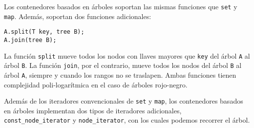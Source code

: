 \documentclass[12pt, letterpaper, twoside]{article}
\begin{document}
Los contenedores basados en árboles soportan las mismas funciones que \texttt{set} y \texttt{map}. Además, soportan dos funciones adicionales: 

\begin{lstlisting}
A.split(T key, tree B);
A.join(tree B);
\end{lstlisting}

La función \texttt{split} mueve todos los nodos con llaves mayores que \texttt{key} del árbol \texttt{A} al árbol \texttt{B}. La función \texttt{join}, por el contrario, mueve todos los nodos del árbol \texttt{B} al árbol \texttt{A}, siempre y cuando los rangos no se traslapen. Ambas funciones tienen complejidad poli-logarítmica en el caso de árboles rojo-negro.

Además de los iteradores convencionales de \texttt{set} y \texttt{map}, los contenedores basados en árboles implementan dos tipos de iteradores adicionales, \texttt{const\_node\_iterator} y \texttt{node\_iterator}, con los cuales podemos recorrer el árbol. 



\newpage
\end{document}
